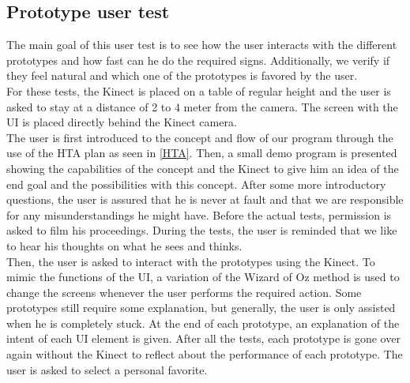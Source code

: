 \subsection{Prototype user test}

The main goal of this user test is to see how the user interacts with the different prototypes and how fast can he do the required signs. Additionally, we verify if they feel natural and which one of the prototypes is favored by the user.\\

For these tests, the Kinect is placed on a table of regular height and the user is asked to stay at a distance of 2 to 4 meter from the camera. The screen with the UI is placed directly behind the Kinect camera.\\

The user is first introduced to the concept and flow of our program through the use of the HTA plan as seen in \ref{HTA}. Then, a small demo program is presented showing the capabilities of the concept and the Kinect to give him an idea of the end goal and the possibilities with this concept. After some more introductory questions, the user is assured that he is never at fault and that we are responsible for any misunderstandings he might have. Before the actual tests, permission is asked to film his proceedings. During the tests, the user is reminded that we like to hear his thoughts on what he sees and thinks.\\

Then, the user is asked to interact with the prototypes using the Kinect. To mimic the functions of the UI, a variation of the Wizard of Oz method \cite{WizardOfOz} is used to change the screens whenever the user performs the required action. Some prototypes still require some explanation, but generally, the user is only assisted when he is completely stuck. At the end of each prototype, an explanation of the intent of each UI element is given. After all the tests, each prototype is gone over again without the Kinect to reflect about the performance of each prototype. The user is asked to select a personal favorite.\\

